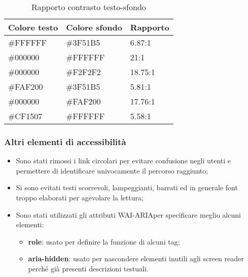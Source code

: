 \begin{longtable}[c]{|l|l|l|}
\caption{Rapporto contrasto testo-sfondo}
\label{tab:contrasto-colori}
\\ \hline
\rowcolor{gray!40}
\textbf{Colore testo} &
\textbf{Colore sfondo} &
\textbf{Rapporto} \\ \hline
\endhead

\#FFFFFF & \#3F51B5 & 6.87:1 \\ \hline

\#000000 & \#FFFFFF & 21:1 \\ \hline

\#000000 & \#F2F2F2 & 18.75:1 \\ \hline

\#FAF200 & \#3F51B5 & 5.81:1 \\ \hline

\#000000 & \#FAF200 & 17.76:1 \\ \hline

\#CF1507 & \#FFFFFF & 5.58:1 \\ \hline
\end{longtable}


\subsubsection{Altri elementi di accessibilità}
\begin{itemize}
    \item Sono stati rimossi i link circolari per evitare confusione negli utenti e permettere di identificare univocamente il percorso raggiunto;
    \item Si sono evitati testi scorrevoli, lampeggianti, barrati ed in generale font troppo elaborati per agevolare la lettura;
    \item Sono stati utilizzati gli attributi \gls{WAI-ARIA}\glsfirstoccur per specificare meglio alcuni elementi:
    \begin{itemize}
        \item \textbf{role}: usato per definire la funzione di alcuni tag;
        \item \textbf{aria-hidden}: usato per nascondere elementi inutili agli screen reader perché già presenti descrizioni testuali.
    \end{itemize}
\end{itemize}


